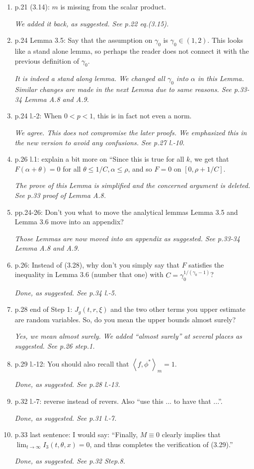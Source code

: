 \documentclass[12pt,a4paper]{amsart}
\numberwithin{equation}{section}
\theoremstyle{plain}
\theoremstyle{definition}
\begin{document}
\begin{enumerate}
  {\it Done, as suggested. See p.22 the line above eq.(3.15).}
\item
  p.21 (3.14): $m$ is missing from the scalar product.

  {\it We added it back, as suggested. See p.22 eq.(3.15).}
\item
  p.24 Lemma 3.5: Say that the assumption on $\gamma_0$ is $\gamma_0 \in (1,2)$.
  This looks like a stand alone lemma, so perhaps the reader does not connect it with the previous definition of $\gamma_0$.

  {\it It is indeed a stand along lemma.
    We changed all $\gamma_0$ into $\alpha$ in this Lemma.
    Similar changes are made in the next Lemma due to same reasons.
See p.33-34 Lemma A.8 and A.9.}
\item
  p.24 l.-2: When $0 < p < 1$, this is in fact not even a norm.

  {\it We agree.
    This does not compromise the later proofs.
    We emphasized this in the new version to avoid any confusions. See p.27 l.-10.}
\item
  p.26 l.1: explain a bit more on ``Since this is true for all $k$, we get that $F(\alpha+\theta) = 0$ for all $\theta \leq 1/C, \alpha \leq \rho$, and so $F = 0$ on $[0, \rho+1/C]$.

  {\it The prove of this Lemma is simplified and the concerned argument is deleted. See p.33 proof of Lemma A.8.}
\item
  pp.24-26: Don't you what to move the analytical lemmas Lemma 3.5 and Lemma 3.6 move into an appendix?

  {\it Those Lemmas are now moved into an appendix as suggested. See p.33-34 Lemma A.8 and A.9.}
\item
  p.26: Instead of (3.28), why don't you simply say that $F$ satisfies the inequality in Lemma 3.6 (number that one) with $C = \gamma_0^{1/(\gamma_0 - 1)}$?

  {\it 
    Done, as suggested. See p.34 l.-5.}
\item
  p.28 end of Step 1: $J_g(t,r,\xi)$ and the two other terms you upper estimate are random variables.
  So, do you mean the upper bounds almost surely?

  {\it Yes, we mean almost surely.
  We added ``almost surely'' at several places as suggested.
  See p.26 step.1.}
\item
  p.29 l.-12: You should also recall that $\left\langle f, \phi^* \right\rangle_m = 1$.

  {\it Done, as suggested. 
    See p.28 l.-13.}
\item
  p.32 l.-7: reverse instead of revers.
  Also ``use this ... to have that ...''.

  {\it Done, as suggested.  See p.31 l.-7.}
\item
  p.33 last sentence: I would say: ``Finally, $M \equiv 0$ clearly implies that $\lim_{t\to \infty} I_3(t,\theta,x) = 0$, and thus completes the verification of (3.29).''

  {\it Done, as suggested. See p.32 Step.8.}
\end{enumerate}


\end{document}
